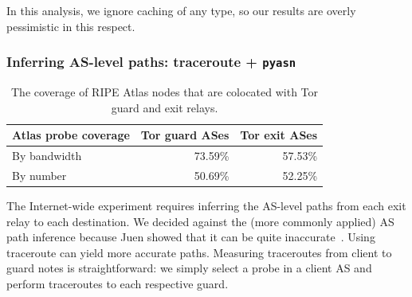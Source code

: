 In this analysis, we ignore caching of any type, so our results are overly 
pessimistic in this respect. 


\subsubsection{Inferring AS-level paths: traceroute + {\tt pyasn}}




\begin{table}[t]
	\caption{The coverage of RIPE Atlas nodes that are colocated with Tor guard and exit
	relays.}
	\label{tab:atlas-coverage}
	\centering
	\begin{tabular}{l|r r}
	\toprule
	\textbf{Atlas probe coverage} & \textbf{Tor guard ASes} & \textbf{Tor exit ASes} \\
	\midrule
	By bandwidth & 73.59\% & 57.53\% \\
	By number & 50.69\% & 52.25\% \\
	\bottomrule
	\end{tabular}
\end{table}


The Internet-wide experiment requires inferring the AS-level paths from
each exit relay to each destination. We decided against the (more
commonly applied) AS path inference because Juen \ea showed that it can
be quite inaccurate~\cite{Juen2015a}.  Using traceroute can yield more
accurate paths.  Measuring traceroutes from client to guard notes is
straightforward: we simply select a probe in a client AS and perform
traceroutes to each respective guard.   

